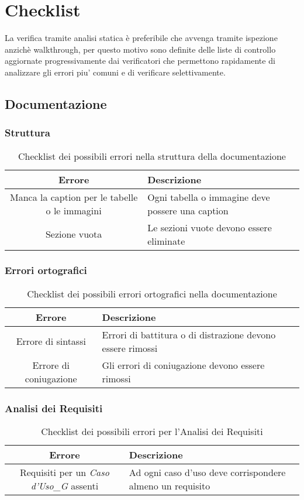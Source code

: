 \section{Checklist}
La verifica tramite analisi statica è preferibile che avvenga tramite ispezione anzichè walkthrough, per questo motivo sono definite delle liste di controllo aggiornate progressivamente dai verificatori che permettono rapidamente di analizzare gli errori piu' comuni e di verificare selettivamente.

\subsection{Documentazione}
\subsubsection{Struttura}
\begin{table}[h]
\centering
\begin{tabular}{|c|p{8cm}|}
\hline
\textbf{Errore} & \textbf{Descrizione} \\
\hline
Manca la caption per le tabelle o le immagini &  Ogni tabella o immagine deve possere una caption\\
\hline
Sezione vuota & Le sezioni vuote devono essere eliminate\\
\hline
\end{tabular}
\caption{Checklist dei possibili errori nella struttura della documentazione}
\end{table}

\subsubsection{Errori ortografici}
\begin{table}[h]
\centering
\begin{tabular}{|c|p{8cm}|}
\hline
\textbf{Errore} & \textbf{Descrizione} \\
\hline
Errore di sintassi &  Errori di battitura o di distrazione devono essere rimossi\\
\hline
Errore di coniugazione & Gli errori di coniugazione devono essere rimossi\\
\hline
\end{tabular}
\caption{Checklist dei possibili errori ortografici nella documentazione}
\end{table}

\subsubsection{Analisi dei Requisiti}
\begin{table}[h]
\centering
\begin{tabular}{|c|p{8cm}|}
\hline
\textbf{Errore} & \textbf{Descrizione} \\
\hline
Requisiti per un \textit{Caso d'Uso_G} assenti &  Ad ogni caso d'uso deve corrispondere almeno un requisito\\
\hline
\end{tabular}
\caption{Checklist dei possibili errori per l'Analisi dei Requisiti}
\end{table}
